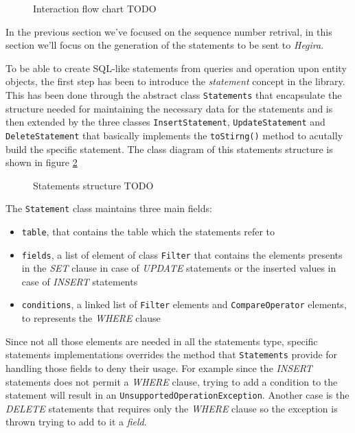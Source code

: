 \begin{figure}[tbh]
  \centering
  \begin{minipage}[c][0.33\textheight][c]{0.5\textwidth}
  \end{minipage}
  \caption{Interaction flow chart TODO}
  \label{fig:flow-chart}
\end{figure} 

\noindent In the previous section we've focused on the sequence number retrival, in this section we'll focus on the generation of the statements to be sent to \textit{Hegira}.

\newparagraph To be able to create SQL-like statements from queries and operation upon entity objects, the first step has been to introduce the \textit{statement} concept in the library. This has been done through the abstract class \texttt{Statements} that encapsulate the structure needed for maintaining the necessary data for the statements and is  then extended by the three classes \texttt{InsertStatement}, \texttt{UpdateStatement} and \texttt{DeleteStatement} that basically implements the \texttt{toStirng()} method to acutally build the specific statement.
The class diagram of this statements structure is shown in figure \ref{fig:statements}

\begin{figure}[tbh]
  \centering
  \begin{minipage}[c][0.33\textheight][c]{0.5\textwidth}
  \end{minipage}
  \caption{Statements structure TODO}
  \label{fig:statements}
\end{figure} 

The \texttt{Statement} class maintains three main fields:
\begin{itemize}
\item \texttt{table}, that contains the table which the statements refer to
\item \texttt{fields}, a list of element of class \texttt{Filter} that contains the elements presents in the \textit{SET} clause in case of \textit{UPDATE} statements or the inserted values in case of \textit{INSERT} statements
\item \texttt{conditions}, a linked list of \texttt{Filter} elements and \texttt{CompareOperator} elements, to represents the \textit{WHERE} clause 
\end{itemize} 

\noindent Since not all those elements are needed in all the statements type, specific statements implementations overrides the method that \texttt{Statements} provide for handling those fields to deny their usage. For example since the \textit{INSERT} statements does not permit a \textit{WHERE} clause, trying to add a condition to the statement will result in an \texttt{UnsupportedOperationException}. Another case is the \textit{DELETE} statements that requires only the \textit{WHERE} clause so the exception is thrown trying to add to it a \textit{field}.


